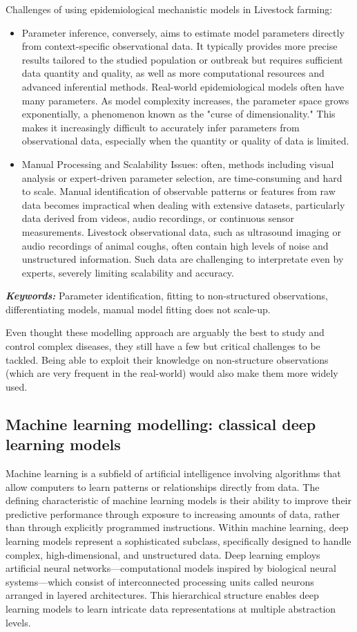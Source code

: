 Challenges of using epidemiological mechanistic models in Livestock farming:

\begin{itemize}
    \item Parameter inference, conversely, aims to estimate model parameters directly from context-specific observational data. It typically provides more precise results tailored to the studied population or outbreak but requires sufficient data quantity and quality, as well as more computational resources and advanced inferential methods. Real-world epidemiological models often have many parameters. As model complexity increases, the parameter space grows exponentially, a phenomenon known as the "curse of dimensionality." This makes it increasingly difficult to accurately infer parameters from observational data, especially when the quantity or quality of data is limited. 
    \item Manual Processing and Scalability Issues: often, methods including visual analysis or expert-driven parameter selection, are time-consuming and hard to scale. Manual identification of observable patterns or features from raw data becomes impractical when dealing with extensive datasets, particularly data derived from videos, audio recordings, or continuous sensor measurements. Livestock observational data, such as ultrasound imaging or audio recordings of animal coughs, often contain high levels of noise and unstructured information. Such data are challenging to interpretate even by experts, severely limiting scalability and accuracy.
\end{itemize}

\textit{\textbf{Keywords:}} Parameter identification, fitting to non-structured observations, differentiating models, manual model fitting does not scale-up.

Even thought these modelling approach are arguably the best to study and control complex diseases, they still have a few but critical challenges to be tackled. Being able to exploit their knowledge on non-structure observations (which are very frequent in the real-world) would also make them more widely used. 


\subsection{Machine learning modelling: classical deep learning models}
Machine learning is a subfield of artificial intelligence involving algorithms that allow computers to learn patterns or relationships directly from data. The defining characteristic of machine learning models is their ability to improve their predictive performance through exposure to increasing amounts of data, rather than through explicitly programmed instructions. Within machine learning, deep learning models represent a sophisticated subclass, specifically designed to handle complex, high-dimensional, and unstructured data. Deep learning employs artificial neural networks—computational models inspired by biological neural systems—which consist of interconnected processing units called neurons arranged in layered architectures. This hierarchical structure enables deep learning models to learn intricate data representations at multiple abstraction levels.

